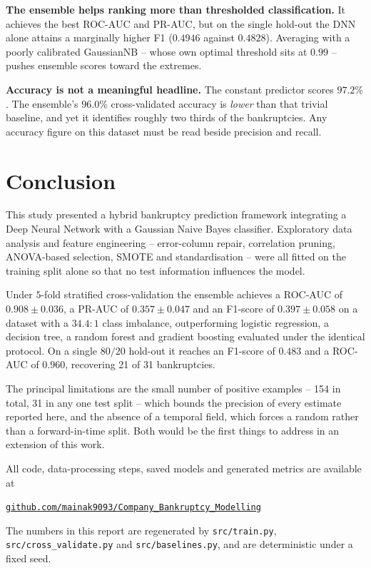 \documentclass[11pt]{article}
\begin{document}
\textbf{The ensemble helps ranking more than thresholded classification.} It
achieves the best ROC-AUC and PR-AUC, but on the single hold-out the DNN alone
attains a marginally higher F1 ($0.4946$ against $0.4828$). Averaging with a
poorly calibrated GaussianNB -- whose own optimal threshold sits at $0.99$ --
pushes ensemble scores toward the extremes.

\textbf{Accuracy is not a meaningful headline.} The constant predictor scores
$97.2\%$. The ensemble's $96.0\%$ cross-validated accuracy is \emph{lower} than
that trivial baseline, and yet it identifies roughly two thirds of the
bankruptcies. Any accuracy figure on this dataset must be read beside
precision and recall.

\section{Conclusion}

This study presented a hybrid bankruptcy prediction framework integrating a
Deep Neural Network with a Gaussian Naive Bayes classifier. Exploratory data
analysis and feature engineering -- error-column repair, correlation pruning,
ANOVA-based selection, SMOTE and standardisation -- were all fitted on the
training split alone so that no test information influences the model.

Under $5$-fold stratified cross-validation the ensemble achieves a
ROC-AUC of $\mathbf{0.908 \pm 0.036}$, a PR-AUC of $\mathbf{0.357 \pm 0.047}$
and an F1-score of $\mathbf{0.397 \pm 0.058}$ on a dataset with a $34.4{:}1$
class imbalance, outperforming logistic regression, a decision tree, a random
forest and gradient boosting evaluated under the identical protocol. On a
single $80/20$ hold-out it reaches an F1-score of $0.483$ and a ROC-AUC of
$0.960$, recovering 21 of 31 bankruptcies.

The principal limitations are the small number of positive examples -- 154 in
total, 31 in any one test split -- which bounds the precision of every estimate
reported here, and the absence of a temporal field, which forces a random
rather than a forward-in-time split. Both would be the first things to address
in an extension of this work.

All code, data-processing steps, saved models and generated metrics are
available at
\begin{center}
\href{https://github.com/mainak9093/Company_Bankruptcy_Modelling}%
     {\texttt{github.com/mainak9093/Company\_Bankruptcy\_Modelling}}
\end{center}
The numbers in this report are regenerated by \texttt{src/train.py},
\texttt{src/cross\_validate.py} and \texttt{src/baselines.py}, and are
deterministic under a fixed seed.
\end{document}
